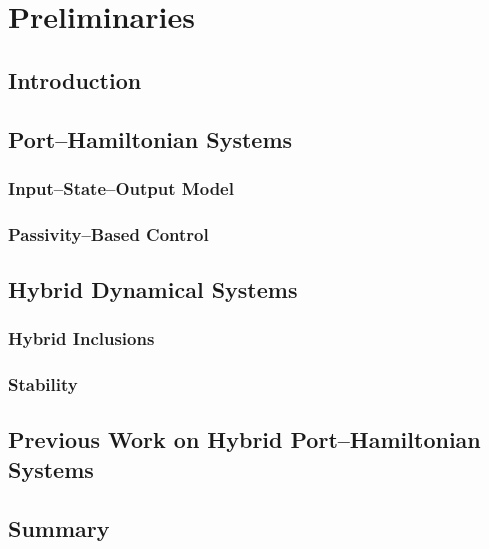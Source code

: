 
\chapter{Preliminaries}
\label{chap:preliminaries}
\minitoc

\thispagestyle{empty}

\newpage
\section{Introduction\label{sec:2_intro}}

\clearpage
\section{Port--Hamiltonian Systems\label{sec:PH_systems}}
\subsection{Input--State--Output Model}
\subsection{Passivity--Based Control}
%
\clearpage

\section{Hybrid Dynamical Systems\label{sec:HD_systems}}
\subsection{Hybrid Inclusions}
\subsection{Stability}

\clearpage

\section{Previous Work on Hybrid Port--Hamiltonian Systems}

\clearpage

\section{Summary}



